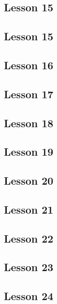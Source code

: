 \subsection{Lesson 15}


\subsection{Lesson 15}


\subsection{Lesson 16}


\subsection{Lesson 17}


\subsection{Lesson 18}


\subsection{Lesson 19}


\subsection{Lesson 20}


\subsection{Lesson 21}


\subsection{Lesson 22}


\subsection{Lesson 23}


\subsection{Lesson 24}


